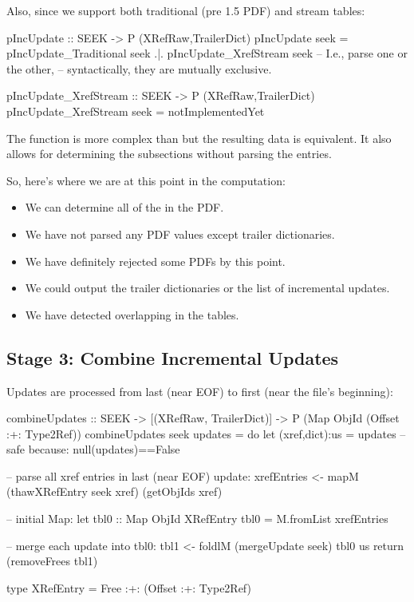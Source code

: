 Also, since we support both traditional (pre 1.5 PDF) and stream
\xref{} tables:

\begin{code}
pIncUpdate :: SEEK -> P (XRefRaw,TrailerDict)
pIncUpdate seek =
      pIncUpdate_Traditional seek
  .|. pIncUpdate_XrefStream seek
      -- I.e., parse one or the other,
      -- syntactically, they are mutually exclusive.

pIncUpdate_XrefStream :: SEEK -> P (XRefRaw,TrailerDict)
pIncUpdate_XrefStream seek = notImplementedYet
\end{code}

The function  is more
complex than  but the resulting
data is equivalent.  It also allows for determining the subsections
without parsing the \xref{} entries.

So, here's where we are at this point in the computation:
\begin{itemize}
\item We can determine all of the \objids{} in the PDF.
\item We have not parsed any PDF values except trailer dictionaries.
\item We have definitely rejected some PDFs by this point.
\item We could output the trailer dictionaries or the list of
  incremental updates.
\item We have detected overlapping \objids{} in the \xref{} tables.
\end{itemize}


\subsection{Stage 3: Combine Incremental Updates}
%
Updates are processed from last (near EOF) to first (near the file's beginning):
\begin{code}
combineUpdates :: SEEK
               -> [(XRefRaw, TrailerDict)] 
               -> P (Map ObjId (Offset :+: Type2Ref))
combineUpdates seek updates =
    do
    let (xref,dict):us = updates -- safe because: null(updates)==False

    -- parse all xref entries in last (near EOF) update:
    xrefEntries <- mapM (thawXRefEntry seek xref) (getObjIds xref)

    -- initial Map:
    let tbl0 :: Map ObjId XRefEntry
        tbl0 = M.fromList xrefEntries

    -- merge each update into tbl0:
    tbl1  <- foldlM (mergeUpdate seek) tbl0 us
    return (removeFrees tbl1)

type XRefEntry = Free :+: (Offset :+: Type2Ref)
\end{code}

